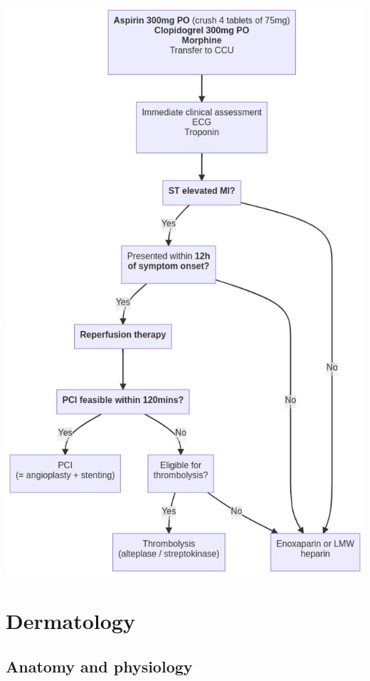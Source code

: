 \documentclass[
  12pt,
]{memoir}
\begin{document}
\includegraphics[width=.7\textwidth]{../assets/med/MI-mx.png}

\pagebreak

\hypertarget{dermatology}{%
\chapter{Dermatology}\label{dermatology}}

\hypertarget{anatomy-and-physiology}{%
\section{Anatomy and physiology}\label{anatomy-and-physiology}}
\end{document}
